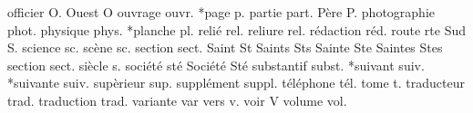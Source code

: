 officier            O.%
{Ouest}             O%
ouvrage             ouvr.%
*page               p.%
partie              part.%
Père                P.%
photographie        phot.%
physique            phys.%
*planche            pl.%
relié             rel.%
reliure             rel.%
rédaction         réd.
route               rte%
{Sud}               S.%
science             sc.%
scène               sc.%
section             sect.%
{Saint}             St%
{Saints}            Sts%
{Sainte}            Ste%
{Saintes}           Stes%
section             sect.%
siècle             s.%
{société}           sté%
{Société}           Sté%
substantif          subst.%
*suivant            suiv.%
*suivante           suiv.%
supèrieur           sup.%
supplément          suppl.%
téléphone           tél.%
tome                t.%
traducteur          trad.%
traduction          trad.%
variante            var%
vers                v.%
voir                V%
volume              vol.%


